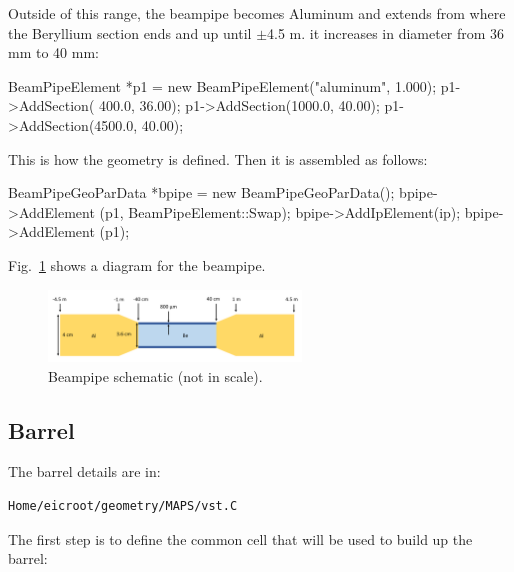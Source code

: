 \documentclass[12pt]{article}
\begin{document}
Outside of this range, the beampipe becomes Aluminum and extends from where the Beryllium section ends and up until $\pm$4.5 m.
it increases in diameter from 36 mm to 40 mm:

\begin{tcolorbox}
\begin{verbnobox}[\scriptsize]
BeamPipeElement *p1 = new BeamPipeElement("aluminum", 1.000);
p1->AddSection( 400.0,  36.00);
p1->AddSection(1000.0,  40.00);
p1->AddSection(4500.0,  40.00);
\end{verbnobox}  
\end{tcolorbox}

This is how the geometry is defined. Then it is assembled as follows:

\begin{tcolorbox}
\begin{verbnobox}[\scriptsize]
BeamPipeGeoParData *bpipe = new BeamPipeGeoParData();
bpipe->AddElement  (p1, BeamPipeElement::Swap);
bpipe->AddIpElement(ip);
bpipe->AddElement  (p1);
\end{verbnobox}  
\end{tcolorbox}

Fig.~\ref{fig:beampipe} shows a diagram for the beampipe.

\begin{figure}[H]
\centering
\includegraphics[width=0.6\textwidth]{figures/beampipe.pdf}
\caption{Beampipe schematic (not in scale).}
\label{fig:beampipe}
\end{figure}

\subsection{Barrel}

The barrel details are in:

\begin{tcolorbox}
\begin{verbatim}
Home/eicroot/geometry/MAPS/vst.C
\end{verbatim}  
\end{tcolorbox}

The first step is to define the common cell that will be used to build up the barrel:
\end{document}
